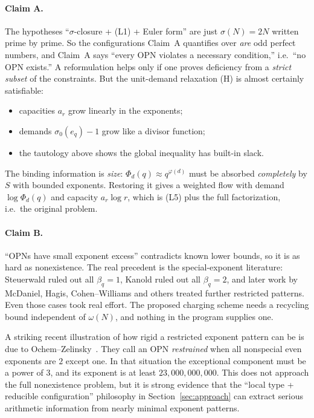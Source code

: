 \documentclass[11pt]{article}
\theoremstyle{definition}
\theoremstyle{remark}
\begin{document}
\paragraph{Claim A.} The hypotheses ``$\sigma$-closure + (L1) +
Euler form'' are just $\sigma(N)=2N$ written prime by prime. So the
configurations Claim~A quantifies over \emph{are} odd perfect numbers,
and Claim~A says ``every OPN violates a necessary condition,'' i.e.\
``no OPN exists.'' A reformulation helps only if one proves deficiency
from a \emph{strict subset} of the constraints. But the unit-demand
relaxation (H) is almost certainly satisfiable:
\begin{itemize}[leftmargin=1.5em]
\item capacities $a_r$ grow linearly in the exponents;
\item demands $\sigma_0(e_q)-1$ grow like a divisor function;
\item the tautology above shows the global inequality has built-in slack.
\end{itemize}
The binding information is \emph{size}: $\Phi_d(q)\approx q^{\varphi(d)}$
must be absorbed \emph{completely} by $S$ with bounded exponents. Restoring
it gives a weighted flow with demand $\log\Phi_d(q)$ and capacity
$a_r\log r$, which is (L5) plus the full factorization, i.e.\ the
original problem.

\paragraph{Claim B.} ``OPNs have small exponent excess'' contradicts
known lower bounds, so it is as hard as nonexistence. The real precedent
is the special-exponent literature: Steuerwald \cite{Steuerwald} ruled
out all $\beta_q=1$, Kanold \cite{Kanold} ruled out all $\beta_q=2$, and
later work by McDaniel, Hagis, Cohen--Williams and others treated further
restricted patterns. Even those cases took real effort. The proposed
charging scheme needs a recycling bound independent of $\omega(N)$, and
nothing in the program supplies one.


A striking recent illustration of how rigid a restricted exponent pattern can
be is due to Ochem--Zelinsky~\cite{OchemZelinsky2026}.  They call an OPN
\emph{restrained} when all nonspecial even exponents are $2$ except one.  In
that situation the exceptional component must be a power of $3$, and its
exponent is at least $23{,}000{,}000{,}000$.  This does not approach the full
nonexistence problem, but it is strong evidence that the ``local type +
reducible configuration'' philosophy in Section~\ref{sec:approach} can extract serious
arithmetic information from nearly minimal exponent patterns.
\end{document}
